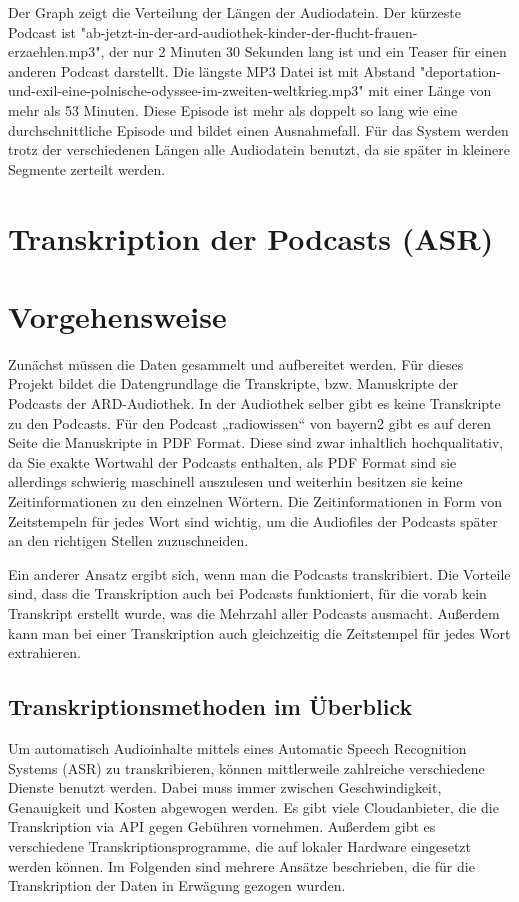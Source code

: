 Der Graph zeigt die Verteilung der Längen der Audiodatein.
Der kürzeste Podcast ist "ab-jetzt-in-der-ard-audiothek-kinder-der-flucht-frauen-erzaehlen.mp3", der nur 2 Minuten 30 Sekunden lang ist und ein Teaser für einen anderen Podcast darstellt.
Die längste MP3 Datei ist mit Abstand "deportation-und-exil-eine-polnische-odyssee-im-zweiten-weltkrieg.mp3" mit einer Länge von mehr als 53 Minuten.
Diese Episode ist mehr als doppelt so lang wie eine durchschnittliche Episode und bildet einen Ausnahmefall.
Für das System werden trotz der verschiedenen Längen alle Audiodatein benutzt, da sie später in kleinere Segmente zerteilt werden.



\section{Transkription der Podcasts (ASR)}

\section{Vorgehensweise}

Zunächst müssen die Daten gesammelt und aufbereitet werden. 
Für dieses Projekt bildet die Datengrundlage die Transkripte, bzw. Manuskripte der Podcasts der ARD-Audiothek. 
In der Audiothek selber gibt es keine Transkripte zu den Podcasts. 
Für den Podcast „radiowissen“ von bayern2 gibt es auf deren Seite die Manuskripte in PDF Format. 
Diese sind zwar inhaltlich hochqualitativ, da Sie exakte Wortwahl der Podcasts enthalten, als PDF Format sind sie allerdings schwierig maschinell auszulesen und weiterhin besitzen sie keine Zeitinformationen zu den einzelnen Wörtern. 
Die Zeitinformationen in Form von Zeitstempeln für jedes Wort sind wichtig, um die Audiofiles der Podcasts später an den richtigen Stellen zuzuschneiden. 

Ein anderer Ansatz ergibt sich, wenn man die Podcasts transkribiert. 
Die Vorteile sind, dass die Transkription auch bei Podcasts funktioniert, für die vorab kein Transkript erstellt wurde, was die Mehrzahl aller Podcasts ausmacht. 
Außerdem kann man bei einer Transkription auch gleichzeitig die Zeitstempel für jedes Wort extrahieren.

\subsection{Transkriptionsmethoden im Überblick}

Um automatisch Audioinhalte mittels eines Automatic Speech Recognition Systems (ASR) zu transkribieren, können mittlerweile zahlreiche verschiedene Dienste benutzt werden.
Dabei muss immer zwischen Geschwindigkeit, Genauigkeit und Kosten abgewogen werden.
Es gibt viele Cloudanbieter, die die Transkription via API gegen Gebühren vornehmen.
Außerdem gibt es verschiedene Transkriptionsprogramme, die auf lokaler Hardware eingesetzt werden können.
Im Folgenden sind mehrere Ansätze beschrieben, die für die Transkription der Daten in Erwägung gezogen wurden.


